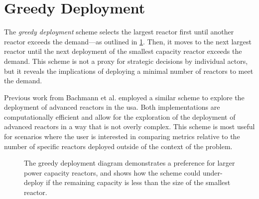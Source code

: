 \section{Greedy Deployment}
\label{sec:greedy_deployment}

The \textit{greedy deployment} scheme selects the largest reactor first until another
reactor exceeds the demand---as outlined in \ref{fig:greedy_diagram}. Then, it moves to the next largest reactor until the next deployment of the smallest capacity reactor exceeds the demand. This scheme is not a proxy for strategic decisions by individual actors, but it reveals the implications of deploying a minimal number of reactors to meet the demand.

Previous work from Bachmann et al. \cite{bachmann_enrichment_2021} employed a similar scheme to explore the deployment of advanced reactors in the \gls{usa}. Both implementations are computationally efficient and allow for the exploration of the deployment of advanced reactors in a way that is not overly complex. This scheme is most useful for scenarios where the user is interested in comparing metrics relative to the number of specific reactors deployed outside of the context of the problem.

\begin{figure}[H]
  \centering
  \caption{The greedy deployment diagram demonstrates a preference for larger power capacity reactors, and shows how the scheme could under-deploy if the remaining capacity is less than the size of the smallest reactor.}
  \label{fig:greedy_diagram}
\end{figure}

